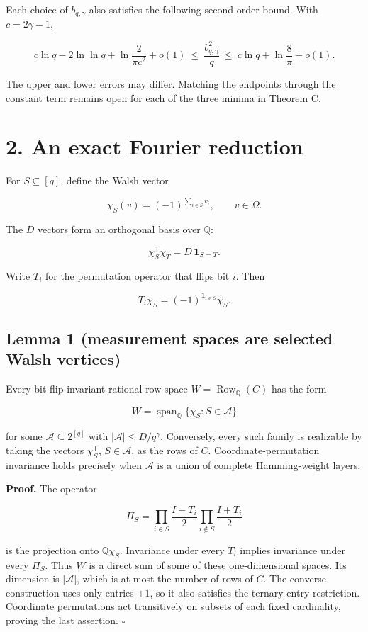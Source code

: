 \documentclass[
  10pt,
]{article}
\begin{document}
Each choice of \(b_{q,\gamma}\) also satisfies the following second-order bound. With \(c=2\gamma-1\),

\[
 c\ln q-2\ln\ln q+\ln\frac{2}{\pi c^2}+o(1)
 \ \le\ \frac{b_{q,\gamma}^2}{q}
 \ \le\ c\ln q+\ln\frac8\pi+o(1).\tag{5}
\]

The upper and lower errors may differ. Matching the endpoints through the constant term remains open for each of the three minima in Theorem C.

\section{2. An exact Fourier reduction}\label{an-exact-fourier-reduction}

For \(S\subseteq[q]\), define the Walsh vector

\[
 \chi_S(v)=(-1)^{\sum_{i\in S}v_i},\qquad v\in\Omega.
\]

The \(D\) vectors form an orthogonal basis over \(\mathbb Q\):

\[
 \chi_S^{\mathsf T}\chi_T=D\,\mathbf1_{S=T}.
\]

Write \(T_i\) for the permutation operator that flips bit \(i\). Then

\[
 T_i\chi_S=(-1)^{\mathbf1_{i\in S}}\chi_S.
\]

\subsection{Lemma 1 (measurement spaces are selected Walsh vertices)}\label{lemma-1-measurement-spaces-are-selected-walsh-vertices}

Every bit-flip-invariant rational row space \(W=\operatorname{Row}_{\mathbb Q}(C)\) has the form

\[
 W=\operatorname{span}_{\mathbb Q}\{\chi_S:S\in\mathcal A\}
\]

for some \(\mathcal A\subseteq 2^{[q]}\) with \(|\mathcal A|\le D/q^\gamma\). Conversely, every such family is realizable by taking the vectors \(\chi_S^{\mathsf T}\), \(S\in\mathcal A\), as the rows of \(C\). Coordinate-permutation invariance holds precisely when \(\mathcal A\) is a union of complete Hamming-weight layers.

\textbf{Proof.} The operator

\[
 \Pi_S=\prod_{i\in S}\frac{I-T_i}{2}
        \prod_{i\notin S}\frac{I+T_i}{2}
\]

is the projection onto \(\mathbb Q\chi_S\). Invariance under every \(T_i\) implies invariance under every \(\Pi_S\). Thus \(W\) is a direct sum of some of these one-dimensional spaces. Its dimension is \(|\mathcal A|\), which is at most the number of rows of \(C\). The converse construction uses only entries \(\pm1\), so it also satisfies the ternary-entry restriction. Coordinate permutations act transitively on subsets of each fixed cardinality, proving the last assertion. \(\square\)
\end{document}

